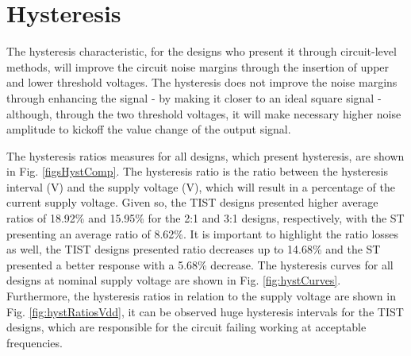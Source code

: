 \documentclass[pgmicro,diss,english]{iiufrgs}
\begin{document}
\section{Hysteresis}

The hysteresis characteristic, for the designs who present it through circuit-level methods, will improve the circuit noise margins through the insertion of upper and lower threshold voltages. The hysteresis does not improve the noise margins through enhancing the signal - by making it closer to an ideal square signal - although, through the two threshold voltages, it will make necessary higher noise amplitude to kickoff the value change of the output signal.

    The hysteresis ratios measures for all designs, which present hysteresis, are shown in Fig. \ref{figsHystComp}. The hysteresis ratio is the ratio between the hysteresis interval (V) and the supply voltage (V), which will result in a percentage of the current supply voltage. Given so, the TIST designs presented higher average ratios of 18.92\% and 15.95\% for the 2:1 and 3:1 designs, respectively, with the ST presenting an average ratio of 8.62\%. It is important to highlight the ratio losses as well, the TIST designs presented ratio decreases up to 14.68\% and the ST presented a better response with a 5.68\% decrease. The hysteresis curves for all designs at nominal supply voltage are shown in Fig. \ref{fig:hystCurves}. Furthermore, the hysteresis ratios in relation to the supply voltage are shown in Fig. \ref{fig:hystRatiosVdd}, it can be observed huge hysteresis intervals for the TIST designs, which are responsible for the circuit failing working at acceptable frequencies.


\end{document}
